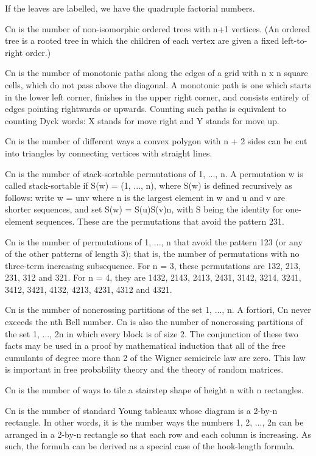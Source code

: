 \documentclass[10pt,letterpaper,twocolumn,twosided]{article}
\begin{document}
If the leaves are labelled, we have the quadruple factorial numbers.

Cn is the number of non-isomorphic ordered trees with n+1 vertices. (An ordered tree is a rooted tree in which the children of each vertex are given a fixed left-to-right order.)

Cn is the number of monotonic paths along the edges of a grid with n x n square cells, which do not pass above the diagonal. A monotonic path is one which starts in the lower left corner, finishes in the upper right corner, and consists entirely of edges pointing rightwards or upwards. Counting such paths is equivalent to counting Dyck words: X stands for move right and Y stands for move up.

Cn is the number of different ways a convex polygon with n + 2 sides can be cut into triangles by connecting vertices with straight lines.

Cn is the number of stack-sortable permutations of {1, ..., n}. A permutation w is called stack-sortable if S(w) = (1, ..., n), where S(w) is defined recursively as follows: write w = unv where n is the largest element in w and u and v are shorter sequences, and set S(w) = S(u)S(v)n, with S being the identity for one-element sequences. These are the permutations that avoid the pattern 231.

Cn is the number of permutations of {1, ..., n} that avoid the pattern 123 (or any of the other patterns of length 3); that is, the number of permutations with no three-term increasing subsequence. For n = 3, these permutations are 132, 213, 231, 312 and 321. For n = 4, they are 1432, 2143, 2413, 2431, 3142, 3214, 3241, 3412, 3421, 4132, 4213, 4231, 4312 and 4321.

Cn is the number of noncrossing partitions of the set {1, ..., n}. A fortiori, Cn never exceeds the nth Bell number. Cn is also the number of noncrossing partitions of the set {1, ..., 2n} in which every block is of size 2. The conjunction of these two facts may be used in a proof by mathematical induction that all of the free cumulants of degree more than 2 of the Wigner semicircle law are zero. This law is important in free probability theory and the theory of random matrices.

Cn is the number of ways to tile a stairstep shape of height n with n rectangles.

Cn is the number of standard Young tableaux whose diagram is a 2-by-n rectangle. In other words, it is the number ways the numbers 1, 2, ..., 2n can be arranged in a 2-by-n rectangle so that each row and each column is increasing. As such, the formula can be derived as a special case of the hook-length formula.
\end{document}
